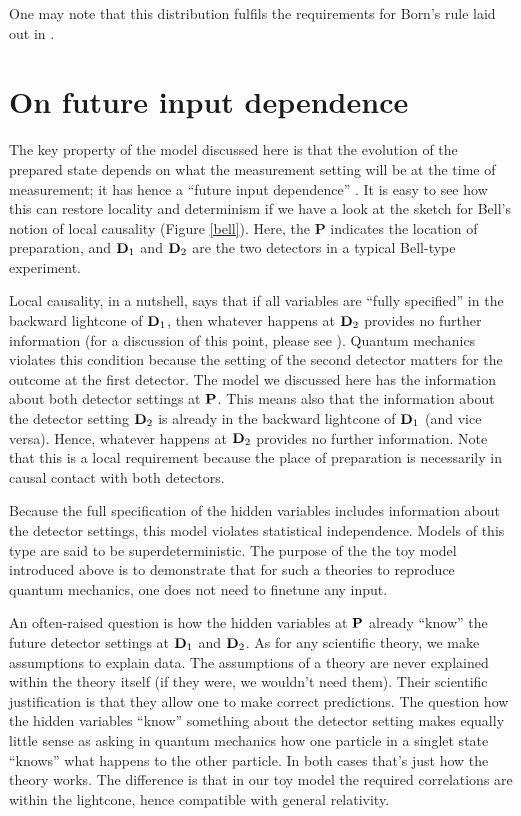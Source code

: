 \documentclass[11pt,twoside,A4]{article}
\begin{document}
One may note that this distribution fulfils the requirements for Born's rule laid out in \cite{Hossenfelder:2020gdb}. 

\section{On future input dependence}

The key property of the model discussed here is that the evolution of the prepared state depends on what the measurement setting will be at the time of measurement; it has hence a ``future input dependence''  \cite{Wharton}. It is easy to see how this can restore locality and determinism if we have a look at the sketch for Bell's notion of local causality (Figure  \ref{bell}). Here, the {\bf P} indicates the location of preparation, and ${\bf D}_1$ and ${\bf D}_2$ are the two detectors in a typical Bell-type experiment. 

Local causality, in a nutshell, says that if all variables are ``fully specified'' in the backward lightcone of ${\bf D}_1$, then whatever happens at ${\bf D}_2$ provides no further information (for a discussion of this point, please see \cite{Norsen2011}). Quantum mechanics violates this condition because the setting of the second detector matters for the outcome at the first detector. The model we discussed here has the information about both detector settings at ${\bf P}$. This means also that the information about the detector setting ${\bf D}_2$ is already in the backward lightcone of ${\bf D}_1$ (and vice versa). Hence, whatever happens at ${\bf D}_2$ provides no further information.  Note that this is a local requirement because the place of preparation is necessarily in causal contact with both detectors. 

Because the full specification of the hidden variables includes information about the detector settings, this model violates statistical independence. Models of this type are said to be superdeterministic. The purpose of the the toy model introduced above is to demonstrate that for such a theories to reproduce quantum mechanics, one does not need to finetune any input. 

An often-raised question is how the hidden variables at ${\bf P}$ already ``know'' the future detector settings at ${\bf D}_1$ and ${\bf D}_2$. As for any scientific theory, we make assumptions to explain data. The assumptions of a theory are never explained within the theory itself (if they were, we wouldn't need them). Their scientific justification is that they allow one to make correct predictions. The question how the hidden variables ``know'' something about the detector setting makes equally little sense as asking in quantum mechanics how one particle in a singlet state ``knows'' what happens to the other particle. In both cases that's just how the theory works. The difference is that in our toy model the required correlations are within the lightcone, hence compatible with general relativity.
\end{document}
